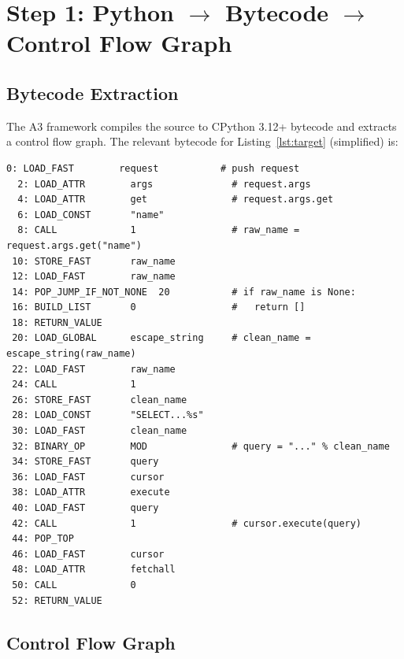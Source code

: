 \documentclass[11pt,a4paper]{article}
\theoremstyle{plain}
\theoremstyle{definition}
\theoremstyle{remark}
\begin{document}
\section{Step 1: Python $\to$ Bytecode $\to$ Control Flow Graph}
\label{sec:cfg}

\subsection{Bytecode Extraction}

The A3 framework compiles the source to CPython 3.12+ bytecode and
extracts a control flow graph.  The relevant bytecode for
Listing~\ref{lst:target} (simplified) is:

\begin{lstlisting}[style=bytecode, caption={Simplified bytecode for \texttt{search\_users}}]
  0: LOAD_FAST        request           # push request
  2: LOAD_ATTR        args              # request.args
  4: LOAD_ATTR        get               # request.args.get
  6: LOAD_CONST       "name"
  8: CALL             1                 # raw_name = request.args.get("name")
 10: STORE_FAST       raw_name
 12: LOAD_FAST        raw_name
 14: POP_JUMP_IF_NOT_NONE  20           # if raw_name is None:
 16: BUILD_LIST       0                 #   return []
 18: RETURN_VALUE
 20: LOAD_GLOBAL      escape_string     # clean_name = escape_string(raw_name)
 22: LOAD_FAST        raw_name
 24: CALL             1
 26: STORE_FAST       clean_name
 28: LOAD_CONST       "SELECT...%s"
 30: LOAD_FAST        clean_name
 32: BINARY_OP        MOD               # query = "..." % clean_name
 34: STORE_FAST       query
 36: LOAD_FAST        cursor
 38: LOAD_ATTR        execute
 40: LOAD_FAST        query
 42: CALL             1                 # cursor.execute(query)
 44: POP_TOP
 46: LOAD_FAST        cursor
 48: LOAD_ATTR        fetchall
 50: CALL             0
 52: RETURN_VALUE
\end{lstlisting}

\subsection{Control Flow Graph}
\end{document}
